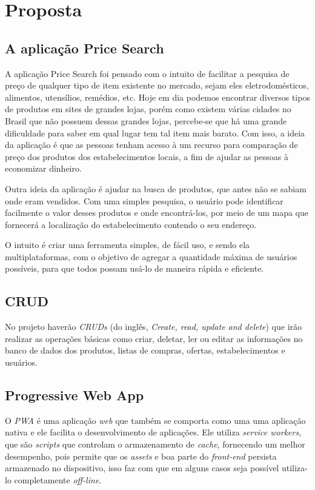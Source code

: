 \section{Proposta}
\label{sec:proposta}

\subsection{A aplicação Price Search}

A aplicação Price Search foi pensado com o intuito de facilitar a pesquisa de preço de qualquer tipo de item existente no mercado, sejam eles eletrodomésticos, alimentos, utensílios, remédios, etc. Hoje em dia podemos encontrar diversos tipos de produtos em sites de grandes lojas, porém como existem várias cidades no Brasil que não possuem dessas grandes lojas, percebe-se que há uma grande dificuldade para saber em qual lugar tem tal item mais barato. Com isso, a ideia da aplicação é que as pessoas tenham acesso à um recurso para comparação de preço dos produtos dos estabelecimentos locais, a fim de ajudar as pessoas à economizar dinheiro. 

Outra ideia da aplicação é ajudar na busca de produtos, que antes não se sabiam onde eram vendidos. Com uma simples pesquisa, o usuário pode identificar facilmente o valor desses produtos e onde encontrá-los, por meio de um mapa que fornecerá a localização do estabelecimento contendo o seu endereço. 

O intuito é criar uma ferramenta simples, de fácil uso, e sendo ela multiplataformas, com o objetivo de agregar a quantidade máxima de usuários possíveis, para que todos possam usá-lo de maneira rápida e eficiente.

\subsection{CRUD}
No projeto haverão \textit{CRUDs} (do inglês, \textit{ Create, read, update and delete}) que irão realizar as operações básicas como criar, deletar, ler ou editar as informações no banco de dados dos produtos, listas de compras, ofertas, estabelecimentos e usuários. 

\subsection{Progressive Web App}

O \textit{PWA} é uma aplicação \textit{web} que também se comporta como uma uma aplicação nativa e ele facilita o desenvolvimento de aplicações. Ele utiliza \textit{service workers}, que são \textit{scripts} que controlam o armazenamento de \textit{cache}, fornecendo um melhor desempenho, pois permite que os \textit{assets} e boa parte do \textit{front-end} persista armazenado no dispositivo, isso faz com que em alguns casos seja possível utiliza-lo completamente \textit{off-line}.

